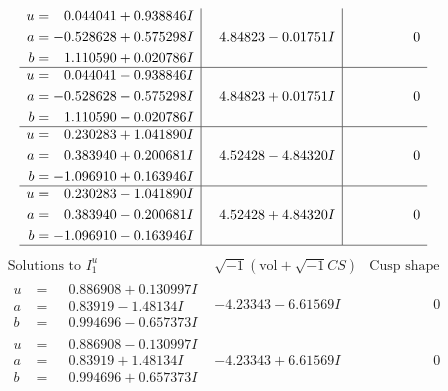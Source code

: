 \documentclass[1p]{elsarticle_modified}
\theoremstyle{definition}
\newcommand{\I}{\sqrt{-1}}
\begin{document}
$$\begin{array}{c|c|c}
\begin{aligned}
u &= \phantom{-}0.044041 + 0.938846 I \\
a &= -0.528628 + 0.575298 I \\
b &= \phantom{-}1.110590 + 0.020786 I\end{aligned}
 & \phantom{-}4.84823 - 0.01751 I & \phantom{-0.000000 } 0 \\ \hline\begin{aligned}
u &= \phantom{-}0.044041 - 0.938846 I \\
a &= -0.528628 - 0.575298 I \\
b &= \phantom{-}1.110590 - 0.020786 I\end{aligned}
 & \phantom{-}4.84823 + 0.01751 I & \phantom{-0.000000 } 0 \\ \hline\begin{aligned}
u &= \phantom{-}0.230283 + 1.041890 I \\
a &= \phantom{-}0.383940 + 0.200681 I \\
b &= -1.096910 + 0.163946 I\end{aligned}
 & \phantom{-}4.52428 - 4.84320 I & \phantom{-0.000000 } 0 \\ \hline\begin{aligned}
u &= \phantom{-}0.230283 - 1.041890 I \\
a &= \phantom{-}0.383940 - 0.200681 I \\
b &= -1.096910 - 0.163946 I\end{aligned}
 & \phantom{-}4.52428 + 4.84320 I & \phantom{-0.000000 } 0\\
 \hline 
 \end{array}$$\newpage$$\begin{array}{c|c|c}  
\text{Solutions to }I^u_{1}& \I (\text{vol} + \sqrt{-1}CS) & \text{Cusp shape}\\
 \hline 
\begin{aligned}
u &= \phantom{-}0.886908 + 0.130997 I \\
a &= \phantom{-}0.83919 - 1.48134 I \\
b &= \phantom{-}0.994696 - 0.657373 I\end{aligned}
 & -4.23343 - 6.61569 I & \phantom{-0.000000 } 0 \\ \hline\begin{aligned}
u &= \phantom{-}0.886908 - 0.130997 I \\
a &= \phantom{-}0.83919 + 1.48134 I \\
b &= \phantom{-}0.994696 + 0.657373 I\end{aligned}
 & -4.23343 + 6.61569 I & \phantom{-0.000000 } 0 \\ \hline\begin{aligned}

\end{aligned}
\end{array}$$
\end{document}
